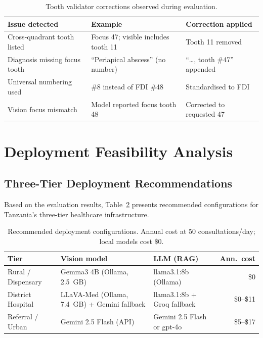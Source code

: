 \documentclass[12pt,a4paper]{report}
\begin{document}
\begin{table}[H]
\centering
\caption{Tooth validator corrections observed during evaluation.}
\label{tab:validator}
\small
\renewcommand{\arraystretch}{1.2}
\begin{tabularx}{\textwidth}{@{}l X l@{}}
\toprule
\textbf{Issue detected} & \textbf{Example} & \textbf{Correction applied} \\
\midrule
Cross-quadrant tooth listed  & Focus 47; visible includes tooth 11 & Tooth 11 removed \\
Diagnosis missing focus tooth & ``Periapical abscess'' (no number)  & ``\ldots, tooth \#47'' appended \\
Universal numbering used     & \#8 instead of FDI \#48             & Standardised to FDI \\
Vision focus mismatch        & Model reported focus tooth 48        & Corrected to requested 47 \\
\bottomrule
\end{tabularx}
\end{table}

\section{Deployment Feasibility Analysis}
\label{sec:results_deployment}

\subsection{Three-Tier Deployment Recommendations}

Based on the evaluation results, Table~\ref{tab:deployment_recommendations}
presents recommended configurations for Tanzania's three-tier healthcare
infrastructure.

\begin{table}[H]
\centering
\caption{Recommended deployment configurations.
Annual cost at 50 consultations/day; local models cost \$0.}
\label{tab:deployment_recommendations}
\small
\renewcommand{\arraystretch}{1.3}
\begin{tabularx}{\textwidth}{@{}l X X r@{}}
\toprule
\textbf{Tier} & \textbf{Vision model} & \textbf{LLM (RAG)} & \textbf{Ann.\ cost} \\
\midrule
Rural / Dispensary  & Gemma3 4B (Ollama, 2.5~GB) & llama3.1:8b (Ollama) & \$0 \\
District Hospital   & LLaVA-Med (Ollama, 7.4~GB) + Gemini fallback & llama3.1:8b + Groq fallback & \$0--\$11 \\
Referral / Urban    & Gemini 2.5 Flash (API) & Gemini 2.5 Flash or gpt-4o & \$5--\$17 \\
\bottomrule
\end{tabularx}
\end{table}
\end{document}
